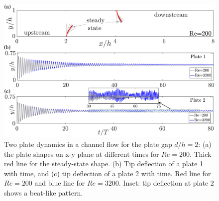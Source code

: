\documentclass[aps,pre,twocolumn,aps,longbibliography]{revtex4-1}
\begin{document}
	
	
	
	\begin{figure}
		\begin{minipage}[c]{1\linewidth}
			\includegraphics[width=1\linewidth]{Fig05.pdf} 
		\end{minipage} 
		\caption{Two plate dynamics in a channel flow for the plate gap $d/h=2$: (a) the plate shapes on x-y plane at different times for $Re=200$. Thick red line for the steady-state shape. (b) Tip deflection of a plate 1 with time, and (c) tip deflection of a plate 2 with time. Red line for $Re=200$ and blue line for $Re=3200$. Inset: tip deflection at plate 2 shows a beat-like pattern.}
		\label{fig:Dfil_dyn_dh2}
	\end{figure}
	
	
	
\end{document}
